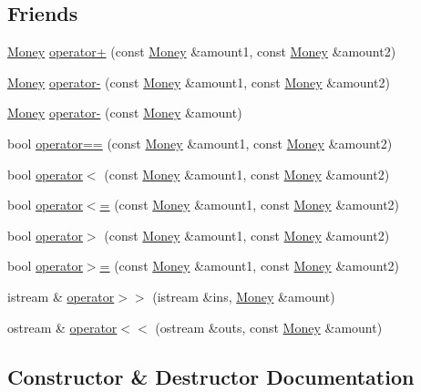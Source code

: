 \subsection*{Friends}
\begin{DoxyCompactItemize}
\item 
\hyperlink{classMoney}{Money} \hyperlink{classMoney_a050c2304648c379e54d793631adc3595}{operator+} (const \hyperlink{classMoney}{Money} \&amount1, const \hyperlink{classMoney}{Money} \&amount2)
\item 
\hyperlink{classMoney}{Money} \hyperlink{classMoney_afcc9c5cd27cc1c1b770681205a45cda0}{operator-\/} (const \hyperlink{classMoney}{Money} \&amount1, const \hyperlink{classMoney}{Money} \&amount2)
\item 
\hyperlink{classMoney}{Money} \hyperlink{classMoney_adeefac843a57c83f4ddd1125c5e001a0}{operator-\/} (const \hyperlink{classMoney}{Money} \&amount)
\item 
bool \hyperlink{classMoney_adfbd10ed3dffab92c205b82c302357c6}{operator==} (const \hyperlink{classMoney}{Money} \&amount1, const \hyperlink{classMoney}{Money} \&amount2)
\item 
bool \hyperlink{classMoney_a31c79d588d6537e80efaa53e75747a61}{operator$<$} (const \hyperlink{classMoney}{Money} \&amount1, const \hyperlink{classMoney}{Money} \&amount2)
\item 
bool \hyperlink{classMoney_ad45da707c7bee0cb12440a1c6ca3dc4b}{operator$<$=} (const \hyperlink{classMoney}{Money} \&amount1, const \hyperlink{classMoney}{Money} \&amount2)
\item 
bool \hyperlink{classMoney_adb213c2f9318ccaadd43a702ab25d614}{operator$>$} (const \hyperlink{classMoney}{Money} \&amount1, const \hyperlink{classMoney}{Money} \&amount2)
\item 
bool \hyperlink{classMoney_af47b787881ddfdc6f98f3a86ba0a9d14}{operator$>$=} (const \hyperlink{classMoney}{Money} \&amount1, const \hyperlink{classMoney}{Money} \&amount2)
\item 
istream \& \hyperlink{classMoney_a4c8e628d575a860141c4fd4f2f38b186}{operator$>$$>$} (istream \&ins, \hyperlink{classMoney}{Money} \&amount)
\item 
ostream \& \hyperlink{classMoney_a8ee9f1db0adb144c0d313ae202d06b3c}{operator$<$$<$} (ostream \&outs, const \hyperlink{classMoney}{Money} \&amount)
\end{DoxyCompactItemize}


\subsection{Constructor \& Destructor Documentation}
